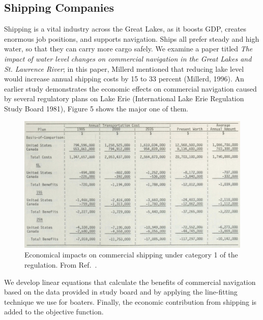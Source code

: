 \documentclass[pre,12pt]{revtex4-1}
\begin{document}
\subsection{Shipping Companies}
Shipping is a vital industry across the Great Lakes, as it boosts GDP, creates enormous job positions, and supports navigation. Ships all prefer steady and high water, so that they can carry more cargo safely. We examine a paper titled \textit{The impact of water level changes on commercial navigation in the Great Lakes and St. Lawrence River}; in this paper, Millerd mentioned that reducing lake level would increase annual shipping costs by 15 to 33 percent (Millerd, 1996). An earlier study demonstrates the economic effects on commercial navigation caused by several regulatory plans on Lake Erie (International Lake Erie Regulation Study Board 1981), Figure 5 shows the major one of them. \par
\begin{figure}[H]
\begin{center}
\includegraphics[width=4.5in]{shipping.png}
\caption{Economical impacts on commercial shipping under category 1 of the regulation. From Ref.~\cite{nd81}.}
\label{leaf}
\end{center}
\end{figure}
We develop linear equations that calculate the benefits of commercial navigation based on the data provided in study board and by applying the line-fitting technique we use for boaters. Finally, the economic contribution from shipping is added to the objective function.
\end{document}
